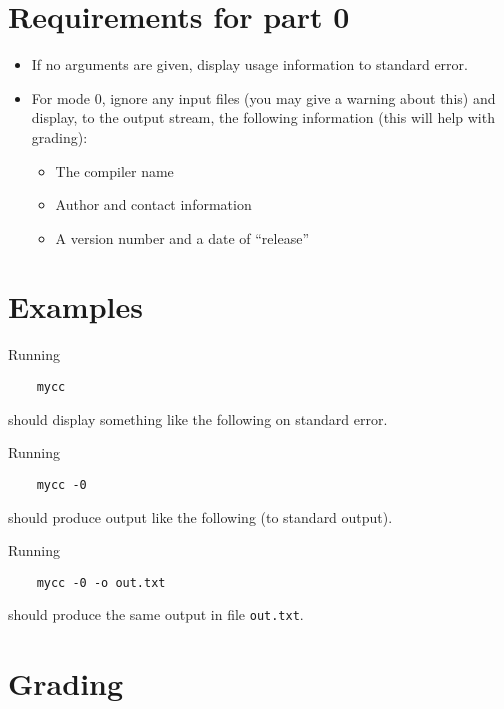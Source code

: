 \documentclass{article}
\begin{document}
\section{Requirements for part 0}

\begin{itemize}
  \item If no arguments are given, display usage information to standard error.
  \item For mode 0, ignore any input files
    (you may give a warning about this)
    and display, to the output stream,
    the following information
    (this will help with grading):
    \begin{itemize}
      \item The compiler name
      \item Author and contact information
      \item A version number and a date of ``release''
    \end{itemize}

\end{itemize}

\section{Examples}


Running
\begin{verbatim}
    mycc
\end{verbatim}
should display something like the following on standard error.

%
%
Running
\begin{verbatim}
    mycc -0
\end{verbatim}
should produce output like the following (to standard output).

%
%
Running
\begin{verbatim}
    mycc -0 -o out.txt
\end{verbatim}
should produce the same output in file {\tt out.txt}.

\section{Grading}
\end{document}
